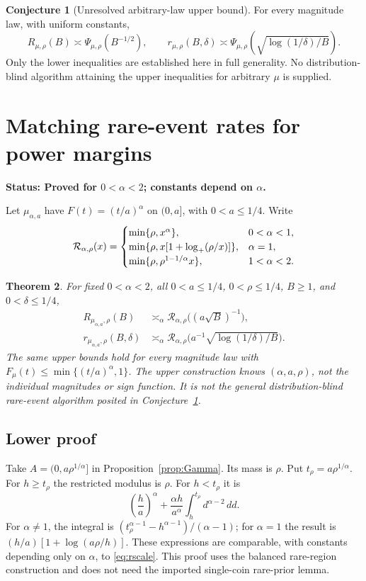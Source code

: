 \documentclass[11pt]{article}
\newtheorem{theorem}{Theorem}[section]
\theoremstyle{definition}\newtheorem{conjecture}[theorem]{Conjecture}
\theoremstyle{remark}\newtheorem{remark}[theorem]{Remark}
\newcommand{\status}[1]{\par\smallskip\noindent\textbf{Status: #1.}\par}
\begin{document}
\begin{conjecture}[Unresolved arbitrary-law upper bound]\label{conj:full}
For every magnitude law, with uniform constants,
\[
 R_{\mu,\rho}(B)\asymp\Psi_{\mu,\rho}(B^{-1/2}),\qquad
 r_{\mu,\rho}(B,\delta)\asymp
 \Psi_{\mu,\rho}\left(\sqrt{\log(1/\delta)/B}\right).
\]
Only the lower inequalities are established here in full generality. No distribution-blind algorithm attaining the upper inequalities for arbitrary $\mu$ is supplied.
\end{conjecture}

\section{Matching rare-event rates for power margins}\label{sec:power}
\status{Proved for $0<\alpha<2$; constants depend on $\alpha$}
Let $\mu_{\alpha,a}$ have $F(t)=(t/a)^\alpha$ on $(0,a]$, with $0<a\le1/4$. Write
\begin{equation}\label{eq:rscale}
 \mathcal R_{\alpha,\rho}(x)=
 \begin{cases}
 \min\{\rho,x^\alpha\},&0<\alpha<1,\\
 \min\{\rho,x[1+\log_+(\rho/x)]\},&\alpha=1,\\
 \min\{\rho,\rho^{1-1/\alpha}x\},&1<\alpha<2.
 \end{cases}
\end{equation}
\begin{theorem}\label{thm:power}
For fixed $0<\alpha<2$, all $0<a\le1/4$, $0<\rho\le1/4$, $B\ge1$, and $0<\delta\le1/4$,
\begin{align*}
 R_{\mu_{\alpha,a},\rho}(B)&\asymp_\alpha
 \mathcal R_{\alpha,\rho}\bigl((a\sqrt B)^{-1}\bigr),\\
 r_{\mu_{\alpha,a},\rho}(B,\delta)&\asymp_\alpha
 \mathcal R_{\alpha,\rho}\bigl(a^{-1}\sqrt{\log(1/\delta)/B}\bigr).
\end{align*}
The same upper bounds hold for every magnitude law with $F_\mu(t)\le\min\{(t/a)^\alpha,1\}$. The upper construction knows $(\alpha,a,\rho)$, not the individual magnitudes or sign function. It is not the general distribution-blind rare-event algorithm posited in Conjecture~\ref{conj:full}.
\end{theorem}

\subsection{Lower proof}
Take $A=(0,a\rho^{1/\alpha}]$ in Proposition~\ref{prop:Gamma}. Its mass is $\rho$. Put $t_\rho=a\rho^{1/\alpha}$. For $h\ge t_\rho$ the restricted modulus is $\rho$. For $h<t_\rho$ it is
\begin{equation}\label{eq:restrictedpower}
 \left(\frac h a\right)^\alpha+
 \frac{\alpha h}{a^\alpha}\int_h^{t_\rho}d^{\alpha-2}\,dd.
\end{equation}
For $\alpha\ne1$, the integral is
$(t_\rho^{\alpha-1}-h^{\alpha-1})/(\alpha-1)$; for $\alpha=1$ the result is
$(h/a)[1+\log(a\rho/h)]$. These expressions are comparable, with constants depending only on $\alpha$, to \eqref{eq:rscale}. This proof uses the balanced rare-region construction and does not need the imported single-coin rare-prior lemma.
\end{document}
